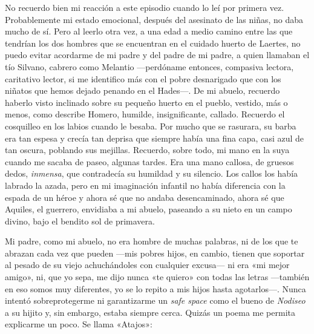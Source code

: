 No recuerdo bien mi reacción a este episodio cuando lo leí por primera vez. Probablemente mi estado emocional, después del asesinato de las niñas, no daba mucho de sí. Pero al leerlo otra vez, a una edad a medio camino entre las que tendrían los dos hombres que se encuentran en el cuidado huerto de Laertes, no puedo evitar acordarme de mi padre y del padre de mi padre, a quien llamaban el tío Silvano, cabrero como Melantio ---perdóname entonces, compasiva lectora, caritativo lector, si me identifico más con el pobre desnarigado que con los niñatos que hemos dejado penando en el Hades---. De mi abuelo, recuerdo haberlo visto inclinado sobre su pequeño huerto en el pueblo, vestido, más o menos, como describe Homero, humilde, insignificante, callado. Recuerdo el cosquilleo en los labios cuando le besaba. Por mucho que se rasurara, su barba era tan espesa y crecía tan deprisa que siempre había una fina capa, casi azul de tan oscura, poblando sus mejillas. Recuerdo, sobre todo, mi mano en la suya cuando me sacaba de paseo, algunas tardes. Era una mano callosa, de gruesos dedos, \emph{inmensa}, que contradecía su humildad y su silencio. Los callos los había labrado la azada, pero en mi imaginación infantil no había diferencia con la espada de un héroe y ahora sé que no andaba desencaminado, ahora sé que Aquiles, el guerrero, envidiaba a mi abuelo, paseando a su nieto en un campo divino, bajo el bendito sol de primavera.

Mi padre, como mi abuelo, no era hombre de muchas palabras, ni de los que te abrazan cada vez que pueden ---mis pobres hijos, en cambio, tienen que soportar al pesado de su viejo achuchándoles con cualquier excusa--- ni era «mi mejor amigo», ni, que yo sepa, me dijo nunca «te quiero» con todas las letras ---también en eso somos muy diferentes, yo se lo repito a mis hijos hasta agotarlos---. Nunca intentó sobreprotegerme ni garantizarme un \emph{safe space} como el bueno de \emph{Nodiseo} a su hijito y, sin embargo, estaba siempre cerca. Quizás un poema me permita explicarme un poco. Se llama «Atajos»:

